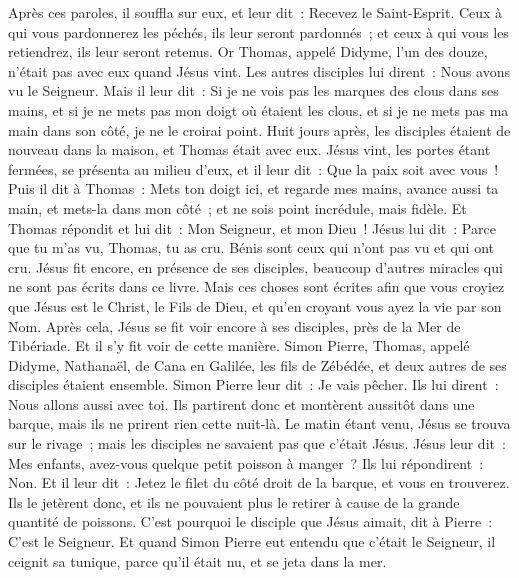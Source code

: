 \begin{multicols}{2}
Après ces paroles, il souffla sur eux, et leur dit~: Recevez le Saint-Esprit.
Ceux à qui vous pardonnerez les péchés, ils leur seront pardonnés~; et ceux à qui vous les retiendrez, ils leur seront retenus.
Or Thomas, appelé Didyme, l'un des douze, n'était pas avec eux quand Jésus vint.
Les autres disciples lui dirent~: Nous avons vu le Seigneur. Mais il leur dit~: Si je ne vois pas les marques des clous dans ses mains, et si je ne mets pas mon doigt où étaient les clous, et si je ne mets pas ma main dans son côté, je ne le croirai point.
Huit jours après, les disciples étaient de nouveau dans la maison, et Thomas était avec eux. Jésus vint, les portes étant fermées, se présenta au milieu d'eux, et il leur dit~: Que la paix soit avec vous~!
Puis il dit à Thomas~: Mets ton doigt ici, et regarde mes mains, avance aussi ta main, et mets-la dans mon côté~; et ne sois point incrédule, mais fidèle.
Et Thomas répondit et lui dit~: Mon Seigneur, et mon Dieu~!
Jésus lui dit~: Parce que tu m'as vu, Thomas, tu as cru. Bénis sont ceux qui n'ont pas vu et qui ont cru.
Jésus fit encore, en présence de ses disciples, beaucoup d'autres miracles qui ne sont pas écrits dans ce livre.
Mais ces choses sont écrites afin que vous croyiez que Jésus est le Christ, le Fils de Dieu, et qu'en croyant vous ayez la vie par son Nom.
\VerseOne{}Après cela, Jésus se fit voir encore à ses disciples, près de la Mer de Tibériade. Et il s'y fit voir de cette manière.
Simon Pierre, Thomas, appelé Didyme, Nathanaël, de Cana en Galilée, les fils de Zébédée, et deux autres de ses disciples étaient ensemble.
Simon Pierre leur dit~: Je vais pêcher. Ils lui dirent~: Nous allons aussi avec toi. Ils partirent donc et montèrent aussitôt dans une barque, mais ils ne prirent rien cette nuit-là.
Le matin étant venu, Jésus se trouva sur le rivage~; mais les disciples ne savaient pas que c'était Jésus.
Jésus leur dit~: Mes enfants, avez-vous quelque petit poisson à manger~? Ils lui répondirent~: Non.
Et il leur dit~: Jetez le filet du côté droit de la barque, et vous en trouverez. Ils le jetèrent donc, et ils ne pouvaient plus le retirer à cause de la grande quantité de poissons.
C'est pourquoi le disciple que Jésus aimait, dit à Pierre~: C'est le Seigneur. Et quand Simon Pierre eut entendu que c'était le Seigneur, il ceignit sa tunique, parce qu'il était nu, et se jeta dans la mer.

\end{multicols}
